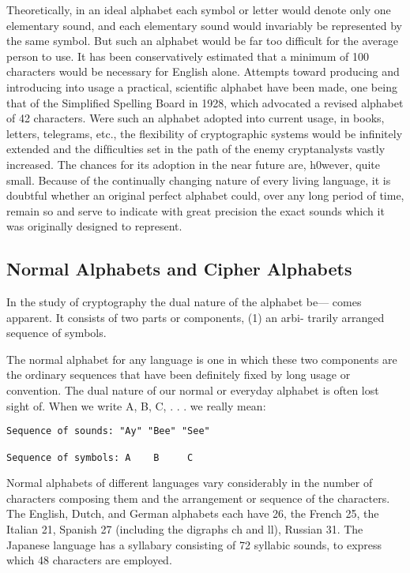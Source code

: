\mypara Theoretically, in an ideal alphabet each symbol or letter would
denote only one elementary sound, and each elementary sound would
invariably be represented by the same symbol. But such an alphabet
would be far too difficult for the average person to use. It has been
conservatively estimated that a minimum of 100 characters would be
necessary for English alone. Attempts toward producing and introducing
into usage a practical, scientiﬁc alphabet have been made, one being that
of the Simpliﬁed Spelling Board in 1928, which advocated a revised
alphabet of 42 characters. Were such an alphabet adopted into current
usage, in books, letters, telegrams, etc., the ﬂexibility of cryptographic
systems would be inﬁnitely extended and the difﬁculties set in the path
of the enemy cryptanalysts vastly increased. The chances for its adoption
in the near future are, h0wever, quite small. Because of the continually
changing nature of every living language, it is doubtful whether an
original perfect alphabet could, over any long period of time, remain
so and serve to indicate with great precision the exact sounds which it
was originally designed to represent.

\subsection{Normal Alphabets and Cipher Alphabets}

\mypara In the study of cryptography the dual nature of the alphabet be—
comes apparent. It consists of two parts or components, (1) an arbi-
trarily arranged sequence of symbols.

\mypara The normal alphabet for any language is one in which these two
components are the ordinary sequences that have been deﬁnitely ﬁxed by
long usage or convention. The dual nature of our normal or everyday
alphabet is often lost sight of. When we write A, B, C, . . . we really
mean:

\begin{verbatim}
Sequence of sounds: "Ay" "Bee" "See"

Sequence of symbols: A    B     C
\end{verbatim}

Normal alphabets of different languages vary considerably in the number
of characters composing them and the arrangement or sequence of the
characters. The English, Dutch, and German alphabets each have 26,
the French 25, the Italian 21, Spanish 27 (including the digraphs ch and
ll), Russian 31. The Japanese language has a syllabary consisting of
72 syllabic sounds, to express which 48 characters are employed.

